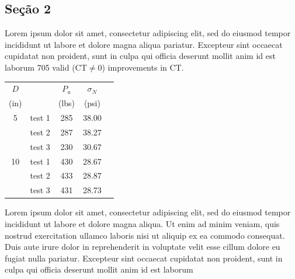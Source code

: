 \documentclass[a0,portrait]{a0poster}
\begin{document}
\begin{minipage}[c]{\linewidth}
\begin{framed}
\begin{multicols}{2}
\section*{Seção 2}
Lorem ipsum dolor sit amet, consectetur adipiscing elit, sed do eiusmod tempor incididunt ut labore et dolore magna aliqua pariatur. Excepteur sint occaecat cupidatat non proident, sunt in culpa qui officia deserunt mollit anim id est laborum 705 valid (CT$\neq$0) improvements in CT.



\begin{center}
\begin{tabular}{clccc}
\toprule
$D$ &               & $P_u$      & $\sigma_N$    \\
(in)&               & (lbs)      & (psi)          \\  \toprule
%
5    & test 1      & 285         & 38.00   \\
& test 2      & 287         & 38.27          \\
& test 3      & 230         & 30.67          \\   \midrule
10   & test 1      & 430         & 28.67   \\
& test 2      & 433         & 28.87          \\
& test 3      & 431         & 28.73          \\    \bottomrule
\end{tabular}
\end{center}

Lorem ipsum dolor sit amet, consectetur adipiscing elit, sed do eiusmod tempor incididunt ut labore et dolore magna aliqua. Ut enim ad minim veniam, quis nostrud exercitation ullamco laboris nisi ut aliquip ex ea commodo consequat. Duis aute irure dolor in reprehenderit in voluptate velit esse cillum dolore eu fugiat nulla pariatur. Excepteur sint occaecat cupidatat non proident, sunt in culpa qui officia deserunt mollit anim id est laborum
\color{Black}

\end{multicols}
\end{framed}
\end{minipage}
\end{document}

